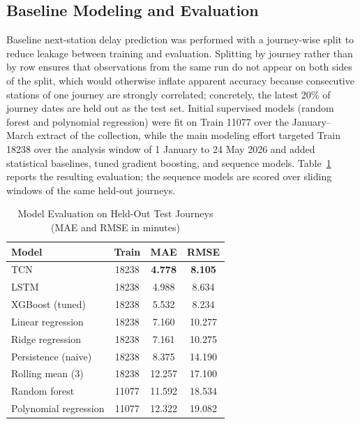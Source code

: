 \documentclass[conference]{IEEEtran}
\begin{document}
\subsection{Baseline Modeling and Evaluation}
Baseline next-station delay prediction was performed with a journey-wise split to reduce leakage between training and evaluation. Splitting by journey rather than by row ensures that observations from the same run do not appear on both sides of the split, which would otherwise inflate apparent accuracy because consecutive stations of one journey are strongly correlated; concretely, the latest 20\% of journey dates are held out as the test set. Initial supervised models (random forest \cite{breiman2001random} and polynomial regression) were fit on Train 11077 over the January--March extract of the collection, while the main modeling effort targeted Train 18238 over the analysis window of 1 January to 24 May 2026 and added statistical baselines, tuned gradient boosting, and sequence models. Table~\ref{tab:model_metrics} reports the resulting evaluation; the sequence models are scored over sliding windows of the same held-out journeys.

\begin{table}[!t]
\centering
\caption{Model Evaluation on Held-Out Test Journeys (MAE and RMSE in minutes)}
\label{tab:model_metrics}
\footnotesize
\setlength{\tabcolsep}{4pt}
\begin{tabular}{@{}lccc@{}}
\toprule
Model & Train & MAE & RMSE \\
\midrule
TCN & 18238 & \textbf{4.778} & \textbf{8.105} \\
LSTM & 18238 & 4.988 & 8.634 \\
XGBoost (tuned) & 18238 & 5.532 & 8.234 \\
Linear regression & 18238 & 7.160 & 10.277 \\
Ridge regression & 18238 & 7.161 & 10.275 \\
Persistence (naive) & 18238 & 8.375 & 14.190 \\
Rolling mean (3) & 18238 & 12.257 & 17.100 \\
\midrule
Random forest & 11077 & 11.592 & 18.534 \\
Polynomial regression & 11077 & 12.322 & 19.082 \\
\bottomrule
\end{tabular}
\end{table}
\end{document}
